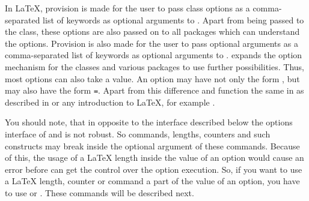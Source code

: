 \begin{Declaration}
\end{Declaration}
In \LaTeX{}, provision is made for the user to pass class options as a
comma-separated list of keywords as optional arguments to
.
Apart from being passed to the class,
these options are also passed on to all packages which can understand
the options. Provision is also made for the user to pass optional
arguments as a comma-separated list of keywords as optional arguments
to .  {\KOMAScript}
expands the
option mechanism for the {\KOMAScript} classes and various packages to
use further possibilities. Thus, most {\KOMAScript} options can also
take a value. An option may have not only the form , but
may also have the form \texttt{=}. Apart
from this difference  and 
function the same in {\KOMAScript} as described in
\cite{latex:usrguide} or any introduction to \LaTeX, for example
\cite{lshort}.%


You should note, that in opposite to the interface
described below the options interface of  and
 is not robust. So commands, lengths, counters and such
constructs may break inside the optional argument of these commands. Because
of this, the usage of a \LaTeX{} length inside the value of an option would
cause an error before \KOMAScript{} can get the control over the option
execution. So, if you want to use a \LaTeX{} length, counter or command a part
of the value of an option, you have to use  or
. These commands will be described next.%
%
\EndIndexGroup


